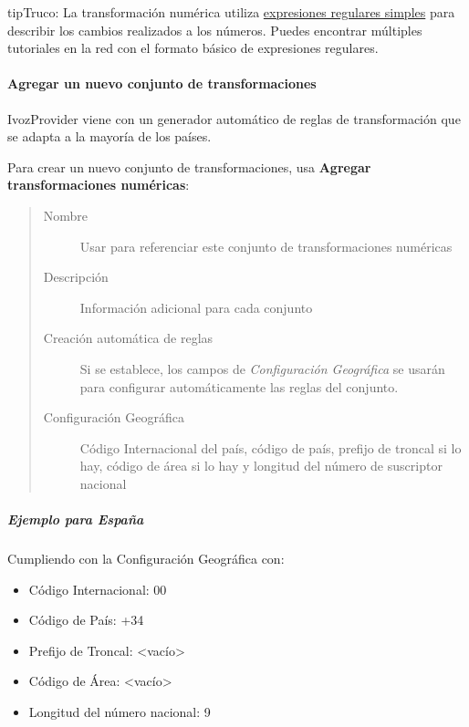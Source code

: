 \documentclass[letterpaper,10pt,spanish]{sphinxmanual}
\begin{document}
\begin{notice}{tip}{Truco:}
La transformación numérica utiliza \href{https://es.wikipedia.org/wiki/Expresi\%C3\%B3n\_regular}{expresiones regulares simples} para describir los cambios realizados a los números. Puedes encontrar múltiples tutoriales en la red con el formato básico de expresiones regulares.
\end{notice}


\paragraph{Agregar un nuevo conjunto de transformaciones}
\label{administration_portal/brand/settings/numeric_transformations:add-a-new-transformation-set}
IvozProvider viene con un generador automático de reglas de transformación que se adapta a la mayoría de los países.

Para crear un nuevo conjunto de transformaciones, usa \textbf{Agregar transformaciones numéricas}:
\begin{quote}
\begin{description}
\item[{Nombre}] \leavevmode
Usar para referenciar este conjunto de transformaciones numéricas

\item[{Descripción}] \leavevmode
Información adicional para cada conjunto

\item[{Creación automática de reglas}] \leavevmode
Si se establece, los campos de \emph{Configuración Geográfica} se usarán para configurar automáticamente las reglas del conjunto.

\item[{Configuración Geográfica}] \leavevmode
Código Internacional del país, código de país, prefijo de troncal si lo hay, código de área si lo hay y longitud del número de suscriptor nacional

\end{description}
\end{quote}


\subparagraph{Ejemplo para España}
\label{administration_portal/brand/settings/numeric_transformations:example-for-spain}
Cumpliendo con la Configuración Geográfica con:
\begin{itemize}
\item {} 
Código Internacional: 00

\item {} 
Código de País: +34

\item {} 
Prefijo de Troncal: \textless{}vacío\textgreater{}

\item {} 
Código de Área: \textless{}vacío\textgreater{}

\item {} 
Longitud del número nacional: 9

\end{itemize}
\end{document}
